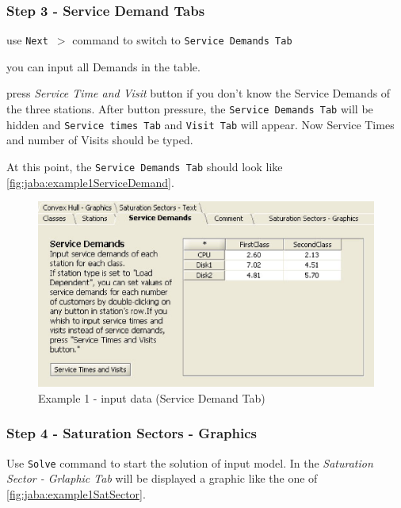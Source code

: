 \subsubsection{Step 3 - Service Demand Tabs}
\begin{itemize*}
\item use \texttt{Next $>$} command to switch to \texttt{Service Demands Tab}
\item you can input all Demands in the table.
\item press \emph{Service Time and Visit} button if you don't know
the Service Demands of the three stations. After button pressure,
the \texttt{Service Demands Tab} will be hidden and \texttt{Service
times Tab} and \texttt{Visit Tab} will appear. Now Service
Times and number of Visits should be typed. 
\end{itemize*}

At this point, the \texttt{Service Demands Tab} should look like
\autoref{fig:jaba:example1ServiceDemand}.

\begin{figure}[htbp]
    \begin{center}
        \includegraphics[scale=.75]{img/jaba/example1ServiceDemand}
    \end{center}
    \caption{Example 1 - input data (Service Demand Tab)}
    \label{fig:jaba:example1ServiceDemand}
\end{figure}


\subsubsection{Step 4 - Saturation Sectors - Graphics}


Use \texttt{Solve} command to start the solution of input model.
In the \textit{Saturation Sector - Grlaphic Tab} will be displayed a graphic like the one of
\autoref{fig:jaba:example1SatSector}.

